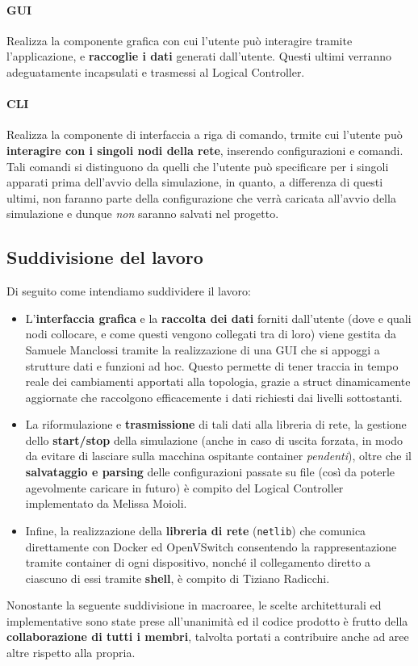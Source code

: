 \paragraph*{GUI} Realizza la componente grafica con cui l'utente può interagire tramite l'applicazione, e \textbf{raccoglie i dati} generati dall'utente. Questi ultimi verranno adeguatamente incapsulati e trasmessi al Logical Controller.

\paragraph*{CLI} Realizza la componente di interfaccia a riga di comando, trmite cui l'utente può \textbf{interagire con i singoli nodi della rete}, inserendo configurazioni e comandi. Tali comandi si distinguono da quelli che l'utente può specificare per i singoli apparati prima dell'avvio della simulazione, in quanto, a differenza di questi ultimi, non faranno parte della configurazione che verrà caricata all'avvio della simulazione e dunque \textit{non} saranno salvati nel progetto.
\subsection{Suddivisione del lavoro}
Di seguito come intendiamo suddividere il lavoro:
\begin{itemize}
    \item L'\textbf{interfaccia grafica} e la \textbf{raccolta dei dati} forniti dall'utente (dove e quali nodi collocare, e come questi vengono collegati tra di loro) viene gestita da Samuele Manclossi tramite la realizzazione di una GUI che si appoggi a strutture dati e funzioni ad hoc. Questo permette di tener traccia in tempo reale dei cambiamenti apportati alla topologia, grazie a struct dinamicamente aggiornate che raccolgono efficacemente i dati richiesti dai livelli sottostanti.
    \item La riformulazione e \textbf{trasmissione} di tali dati alla libreria di rete, la gestione dello \textbf{start/stop} della simulazione (anche in caso di uscita forzata, in modo da evitare di lasciare sulla macchina ospitante container \textsl{pendenti}), oltre che il \textbf{salvataggio e parsing} delle configurazioni passate su file (così da poterle agevolmente caricare in futuro) è compito del Logical Controller implementato da Melissa Moioli.
    \item Infine, la realizzazione della \textbf{libreria di rete} (\texttt{netlib}) che comunica direttamente con Docker ed OpenVSwitch consentendo la rappresentazione tramite container di ogni dispositivo, nonché il collegamento diretto a ciascuno di essi tramite \textbf{shell}, è compito di Tiziano Radicchi.
\end{itemize}
Nonostante la seguente suddivisione in macroaree, le scelte architetturali ed implementative sono state prese all'unanimità ed il codice prodotto è frutto della \textbf{collaborazione di tutti i membri}, talvolta portati a contribuire anche ad aree altre rispetto alla propria.


\newpage